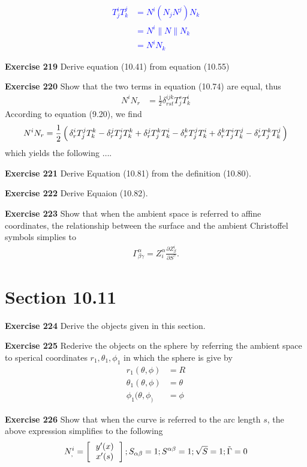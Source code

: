 \documentclass[12pt,a4paper]{report}
\newcommand{\BLUE}[1]{\textcolor{blue}{#1}}
\begin{document}
\begin{description}
\BLUE{
\begin{align*}
		T_j^iT_k^j &= N^i(N_jN^j)N_k \\
		&= N^i\|N\|N_k \\
		&= N^iN_k
\end{align*}
}

\item\textbf{Exercise 219} Derive equation (10.41) from equation (10.55)
\item \textbf{Exercise 220} Show that the two terms in equation (10.74) are equal, thus
\begin{align*}
	N^iN_r &= \frac{1}{2}\delta_{rst}^{ijk}T_j^sT_k^i
\end{align*}According to equation (9.20), we find 
\begin{align*}
N^iN_r = \frac{1}{2}\left (\, \delta_r^iT_j^jT_k^k-\delta_r^jT_j^iT_k^k+\delta_r^jT_j^kT_k^i-\delta_r^kT_j^jT_k^i+\delta_r^kT_j^iT_k^j-\delta_r^iT_j^kT_k^j \,\right )
\end{align*}which yields the following $\dots$.
\item \textbf{Exercise 221} Derive Equation (10.81) from the definition (10.80).
\item \textbf{Exercise 222} Derive Equaion (10.82).
\item \textbf{Exercise 223} Show that when the ambient space is referred to affine coordinates, the relationship between the surface and the ambient Christoffel symbols simplies to 
\begin{align*}
	\Gamma_{\beta\gamma}^\alpha = Z_i^\alpha\frac{\partial Z_\beta^i}{\partial S^\gamma}.
\end{align*}
\section*{Section 10.11}
\item \textbf{Exercise 224} Derive the objects given in this section.
\item \textbf{Exercise 225} Rederive the objects on the sphere by referring the ambient space to sperical coordinates $r_1, \theta_1, \phi_1$ in which the sphere is give by 
\begin{align*}
	r_1(\theta,\phi) &= R\\
	\theta_1(\theta, \phi) &= \theta \\
	\phi_1(\theta,\phi_) &= \phi
\end{align*}
\item \textbf{Exercise 226} Show that when the curve is referred to the arc length $s$, the above expression simplifies to the following
\begin{align*}
	N^i_, = \left [\, \begin{array}{c} y'(x)\\x'(s) \end{array}  \,\right ]; S_{\alpha\beta} =1 ; S^{\alpha\beta}=1; \sqrt{S}=1; \tilde{\Gamma} = 0
\end{align*}

\end{description}
\end{document}
